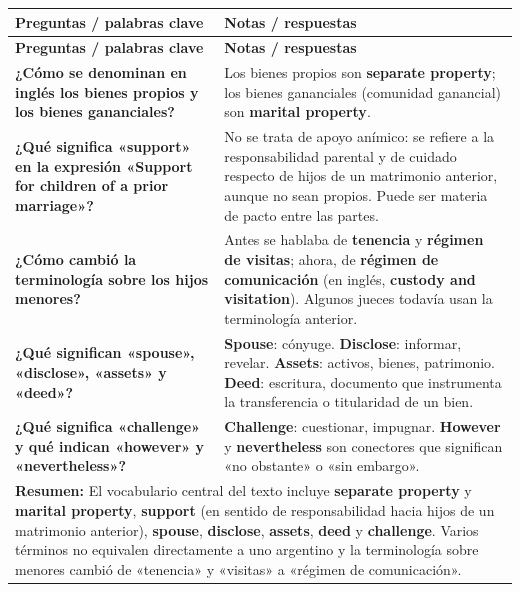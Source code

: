 \documentclass[12pt,oneside]{book}
\newlength{\cornL}
\newlength{\cornR}
\newlength{\cornW}
\begin{document}
\begin{longtable}{@{}p{\cornL}|p{\cornR}@{}}
\toprule
\textbf{Preguntas / palabras clave} & \textbf{Notas / respuestas} \\
\midrule
\endfirsthead
\toprule
\textbf{Preguntas / palabras clave} & \textbf{Notas / respuestas} \\
\midrule
\endhead
\bottomrule
\endfoot
\bottomrule
\endlastfoot

\textbf{¿Cómo se denominan en inglés los bienes propios y los bienes gananciales?} &
Los bienes propios son \textbf{separate property}; los bienes gananciales (comunidad ganancial) son \textbf{marital property}. \\[0.6em]

\textbf{¿Qué significa «support» en la expresión «Support for children of a prior marriage»?} &
No se trata de apoyo anímico: se refiere a la responsabilidad parental y de cuidado respecto de hijos de un matrimonio anterior, aunque no sean propios. Puede ser materia de pacto entre las partes. \\[0.6em]

\textbf{¿Cómo cambió la terminología sobre los hijos menores?} &
Antes se hablaba de \textbf{tenencia} y \textbf{régimen de visitas}; ahora, de \textbf{régimen de comunicación} (en inglés, \textbf{custody and visitation}). Algunos jueces todavía usan la terminología anterior. \\[0.6em]

\textbf{¿Qué significan «spouse», «disclose», «assets» y «deed»?} &
\textbf{Spouse}: cónyuge. \textbf{Disclose}: informar, revelar. \textbf{Assets}: activos, bienes, patrimonio. \textbf{Deed}: escritura, documento que instrumenta la transferencia o titularidad de un bien. \\[0.6em]

\textbf{¿Qué significa «challenge» y qué indican «however» y «nevertheless»?} &
\textbf{Challenge}: cuestionar, impugnar. \textbf{However} y \textbf{nevertheless} son conectores que significan «no obstante» o «sin embargo». \\[0.6em]

\midrule
\multicolumn{2}{p{\cornW}}{%
\textbf{Resumen:} El vocabulario central del texto incluye \textbf{separate property} y \textbf{marital property}, \textbf{support} (en sentido de responsabilidad hacia hijos de un matrimonio anterior), \textbf{spouse}, \textbf{disclose}, \textbf{assets}, \textbf{deed} y \textbf{challenge}. Varios términos no equivalen directamente a uno argentino y la terminología sobre menores cambió de «tenencia» y «visitas» a «régimen de comunicación».
} \\
\end{longtable}
\end{document}
